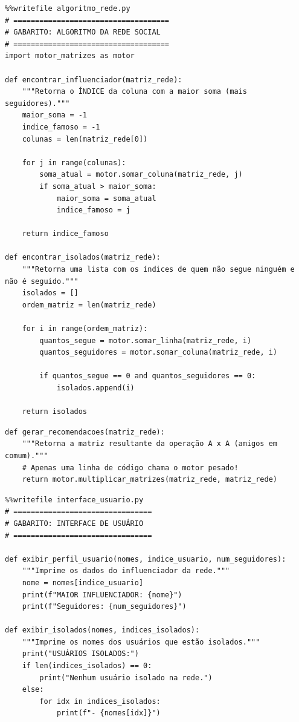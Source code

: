 \documentclass[../numerical_methods.tex]{subfiles}
\begin{document}
\begin{listing}[H]
	\begin{verbatim}
%%writefile algoritmo_rede.py
# ====================================
# GABARITO: ALGORITMO DA REDE SOCIAL
# ====================================
import motor_matrizes as motor

def encontrar_influenciador(matriz_rede):
    """Retorna o ÍNDICE da coluna com a maior soma (mais seguidores)."""
    maior_soma = -1
    indice_famoso = -1
    colunas = len(matriz_rede[0])

    for j in range(colunas):
        soma_atual = motor.somar_coluna(matriz_rede, j)
        if soma_atual > maior_soma:
            maior_soma = soma_atual
            indice_famoso = j

    return indice_famoso

def encontrar_isolados(matriz_rede):
    """Retorna uma lista com os índices de quem não segue ninguém e não é seguido."""
    isolados = []
    ordem_matriz = len(matriz_rede)

    for i in range(ordem_matriz):
        quantos_segue = motor.somar_linha(matriz_rede, i) 
        quantos_seguidores = motor.somar_coluna(matriz_rede, i) 

        if quantos_segue == 0 and quantos_seguidores == 0:
            isolados.append(i)

    return isolados
\end{verbatim}
\end{listing}

\pagebreak
\begin{verbatim}
def gerar_recomendacoes(matriz_rede):
    """Retorna a matriz resultante da operação A x A (amigos em comum)."""
    # Apenas uma linha de código chama o motor pesado!
    return motor.multiplicar_matrizes(matriz_rede, matriz_rede)
\end{verbatim}

\begin{listing}[H]
	\begin{verbatim}
%%writefile interface_usuario.py
# ================================
# GABARITO: INTERFACE DE USUÁRIO
# ================================

def exibir_perfil_usuario(nomes, indice_usuario, num_seguidores):
    """Imprime os dados do influenciador da rede."""
    nome = nomes[indice_usuario]
    print(f"MAIOR INFLUENCIADOR: {nome}")
    print(f"Seguidores: {num_seguidores}")

def exibir_isolados(nomes, indices_isolados):
    """Imprime os nomes dos usuários que estão isolados."""
    print("USUÁRIOS ISOLADOS:")
    if len(indices_isolados) == 0:
        print("Nenhum usuário isolado na rede.")
    else:
        for idx in indices_isolados:
            print(f"- {nomes[idx]}")

\end{verbatim}
\end{listing}
\end{document}
